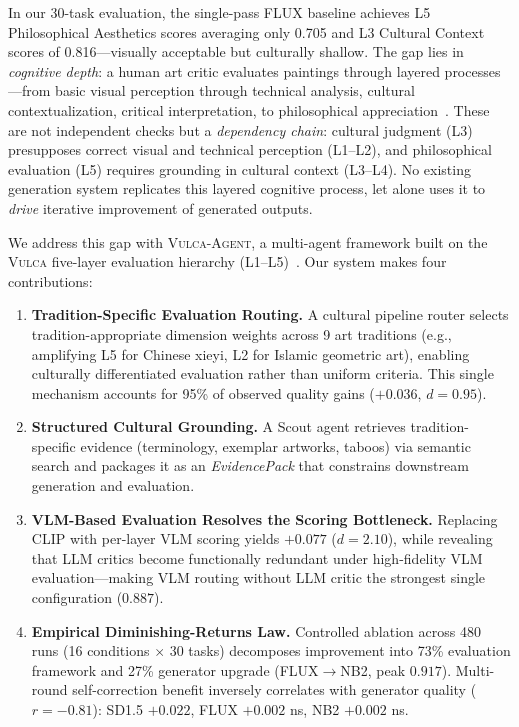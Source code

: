 \documentclass[sigconf, screen, review, anonymous]{acmart}
\newcommand{\vulca}{\textsc{Vulca}}
\newcommand{\system}{\textsc{Vulca-Agent}}
\newcommand{\Lx}[1]{L#1}
\begin{document}
In our 30-task evaluation, the single-pass FLUX baseline achieves \Lx{5} Philosophical Aesthetics scores averaging only 0.705 and \Lx{3} Cultural Context scores of 0.816---visually acceptable but culturally shallow.
The gap lies in \emph{cognitive depth}: a human art critic evaluates paintings through layered processes---from basic visual perception through technical analysis, cultural contextualization, critical interpretation, to philosophical appreciation~\cite{panofsky1939studies, barrett2011criticizing}.
These are not independent checks but a \emph{dependency chain}: cultural judgment (\Lx{3}) presupposes correct visual and technical perception (\Lx{1}--\Lx{2}), and philosophical evaluation (\Lx{5}) requires grounding in cultural context (\Lx{3}--\Lx{4}).
No existing generation system replicates this layered cognitive process, let alone uses it to \emph{drive} iterative improvement of generated outputs.

We address this gap with \system{}, a multi-agent framework built on the \vulca{} five-layer evaluation hierarchy (\Lx{1}--\Lx{5})~\cite{yu2025vulca, yu2025vulcabench}.
Our system makes four contributions:

\begin{enumerate}
    \item \textbf{Tradition-Specific Evaluation Routing.} A cultural pipeline router selects tradition-appropriate dimension weights across 9 art traditions (e.g., amplifying \Lx{5} for Chinese xieyi, \Lx{2} for Islamic geometric art), enabling culturally differentiated evaluation rather than uniform criteria. This single mechanism accounts for 95\% of observed quality gains ($+0.036$, $d = 0.95$).

    \item \textbf{Structured Cultural Grounding.} A Scout agent retrieves tradition-specific evidence (terminology, exemplar artworks, taboos) via semantic search and packages it as an \emph{EvidencePack} that constrains downstream generation and evaluation.

    \item \textbf{VLM-Based Evaluation Resolves the Scoring Bottleneck.} Replacing CLIP with per-layer VLM scoring yields $+0.077$ ($d = 2.10$), while revealing that LLM critics become functionally redundant under high-fidelity VLM evaluation---making VLM routing without LLM critic the strongest single configuration ($0.887$).

    \item \textbf{Empirical Diminishing-Returns Law.} Controlled ablation across 480 runs (16 conditions $\times$ 30 tasks) decomposes improvement into 73\% evaluation framework and 27\% generator upgrade (FLUX$\to$NB2, peak $0.917$). Multi-round self-correction benefit inversely correlates with generator quality ($r = -0.81$): SD1.5 $+0.022$, FLUX $+0.002$ ns, NB2 $+0.002$ ns.
\end{enumerate}
\end{document}
